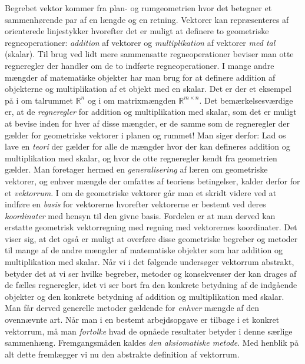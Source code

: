 Begrebet vektor kommer fra plan- og rumgeometrien hvor det betegner et sam\-men\-hør\-en\-de par af en længde og en retning. Vektorer kan repræsenteres af orienterede linjestykker hvorefter det er muligt at definere to geometriske regneoperationer: \textit{addition} af vektorer og \textit{multiplikation} af vektorer \textit{med tal} (skalar). Til brug ved lidt mere sammensatte regneoperationer beviser man otte regneregler der handler om de to indførte regneoperationer.\bs
I mange andre mængder af matematiske objekter har man brug for at definere addition af objekterne og multiplikation af et objekt med en skalar. Det er der et eksempel på i  om talrummet $\mathbb R^n$ og i  om matrixmængden $\mathbb R^{m\times n}$. Det bemærkelsesværdige er, at de \textit{regneregler} for addition og multiplikation med skalar, som det er muligt at bevise inden for hver af disse mængder, er de samme som de regneregler der gælder for geometriske vektorer i planen og rummet! Man siger derfor: Lad os lave en \textit{teori} der gælder for alle de mængder hvor der kan defineres addition og multiplikation med skalar, og hvor de otte regneregler kendt fra geometrien gælder. Man foretager hermed en \textit{generalisering} af læren om geometriske vektorer, og enhver mængde der omfattes af teoriens betingelser, kalder derfor for et \textit{vektorrum}.\bs
I  om de geometriske vektorer går man et skridt videre ved at indføre en \textit{basis} for vektorerne hvorefter vektorerne er bestemt ved deres \textit{koordinater} med hensyn til den givne basis. Fordelen er at man derved kan erstatte geometrisk vektorregning med regning med vektorernes koordinater. Det viser sig, at det også er muligt at overføre disse geometriske begreber og metoder til mange af de andre mængder af matematiske objekter som har addition og multiplikation med skalar. \bs
Når vi i det følgende undersøger vektorrum abstrakt, betyder det at vi ser hvilke begreber, metoder og konsekvenser der kan drages af de fælles regneregler, idet vi ser bort fra den konkrete betydning af de indgående objekter og den konkrete betydning af addition og multiplikation med skalar. Man får derved generelle metoder gældende for \textit{enhver} mængde af den ovennævnte art. Når man i en bestemt arbejds\-opgave er tilbage i et konkret vektorrum, må man \textit{fortolke} hvad de opnåede resultater betyder i denne særlige sammenhæng. Fremgangsmåden kaldes \textit{den aksiomatiske metode}. Med henblik på alt dette fremlægger vi nu den abstrakte definition af vektorrum.

